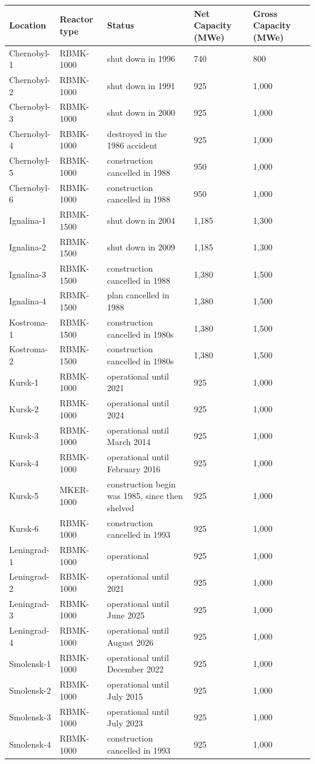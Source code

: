 \documentclass{article}
\begin{document}
\begin{tabular}{lllll}
\toprule
Location & Reactor type & Status & Net Capacity (MWe) & Gross Capacity (MWe) \\
\midrule
Chernobyl-1 & RBMK-1000 & shut down in 1996 & 740 & 800 \\
Chernobyl-2 & RBMK-1000 & shut down in 1991 & 925 & 1,000 \\
Chernobyl-3 & RBMK-1000 & shut down in 2000 & 925 & 1,000 \\
Chernobyl-4 & RBMK-1000 & destroyed in the 1986 accident & 925 & 1,000 \\
Chernobyl-5 & RBMK-1000 & construction cancelled in 1988 & 950 & 1,000 \\
Chernobyl-6 & RBMK-1000 & construction cancelled in 1988 & 950 & 1,000 \\
Ignalina-1 & RBMK-1500 & shut down in 2004 & 1,185 & 1,300 \\
Ignalina-2 & RBMK-1500 & shut down in 2009 & 1,185 & 1,300 \\
Ignalina-3 & RBMK-1500 & construction cancelled in 1988 & 1,380 & 1,500 \\
Ignalina-4 & RBMK-1500 & plan cancelled in 1988 & 1,380 & 1,500 \\
Kostroma-1 & RBMK-1500 & construction cancelled in 1980s & 1,380 & 1,500 \\
Kostroma-2 & RBMK-1500 & construction cancelled in 1980s & 1,380 & 1,500 \\
Kursk-1 & RBMK-1000 & operational until 2021 & 925 & 1,000 \\
Kursk-2 & RBMK-1000 & operational until 2024 & 925 & 1,000 \\
Kursk-3 & RBMK-1000 & operational until March 2014 & 925 & 1,000 \\
Kursk-4 & RBMK-1000 & operational until February 2016 & 925 & 1,000 \\
Kursk-5 & MKER-1000 & construction begin was 1985, since then shelved & 925 & 1,000 \\
Kursk-6 & RBMK-1000 & construction cancelled in 1993 & 925 & 1,000 \\
Leningrad-1 & RBMK-1000 & operational & 925 & 1,000 \\
Leningrad-2 & RBMK-1000 & operational until 2021 & 925 & 1,000 \\
Leningrad-3 & RBMK-1000 & operational until June 2025 & 925 & 1,000 \\
Leningrad-4 & RBMK-1000 & operational until August 2026 & 925 & 1,000 \\
Smolensk-1 & RBMK-1000 & operational until December 2022 & 925 & 1,000 \\
Smolensk-2 & RBMK-1000 & operational until July 2015 & 925 & 1,000 \\
Smolensk-3 & RBMK-1000 & operational until July 2023 & 925 & 1,000 \\
Smolensk-4 & RBMK-1000 & construction cancelled in 1993 & 925 & 1,000 \\
\bottomrule
\end{tabular}
\end{document}
